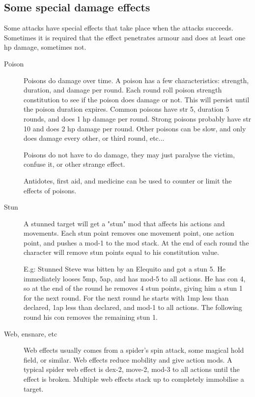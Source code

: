

\subsection*{Some special damage effects}
Some attacks have special effects that take place when the attacks succeeds. Sometimes it is required that the effect penetrates armour and does at least one hp damage, sometimes not.


\begin{description}


\item[Poison]
Poisons do damage over time. A poison has a few characteristics: strength, duration, and damage per round. Each round roll poison strength \vs constitution to see if the poison does damage or not. This will persist until the poison duration expires. Common poisons have str 5, duration 5 rounds, and does 1 hp damage per round. Strong poisons probably have str 10 and does 2 hp damage per round. Other poisons can be slow, and only does damage every other, or third round, etc...

Poisons do not have to do damage, they may just paralyse the victim, confuse it, or other strange effect.

Antidotes, first aid, and medicine can be used to counter or limit the effects of poisons.


\item[Stun]
A stunned target will get a "stun" mod that affects his actions and movements. Each stun point removes one movement point, one action point, and pushes a mod-1 to the mod stack. At the end of each round the character will remove stun points equal to his constitution value.

E.g: Stunned Steve was bitten by an Elequito and got a stun 5. He immediately looses 5mp, 5ap, and has mod-5 to all actions. He has con 4, so at the end of the round he removes 4 stun points, giving him a stun 1 for the next round. For the next round he starts with 1mp less than declared, 1ap less than declared, and mod-1 to all actions. The following round his con removes the remaining stun 1.



\item[Web, ensnare, etc]
Web effects usually comes from a spider's spin attack, some magical hold field, or similar. Web effects reduce mobility and give action mods.
A typical spider web effect is dex-2, move-2, mod-3 to all actions until the effect is broken. Multiple web effects stack up to completely immobilise a target.


\end{description}
